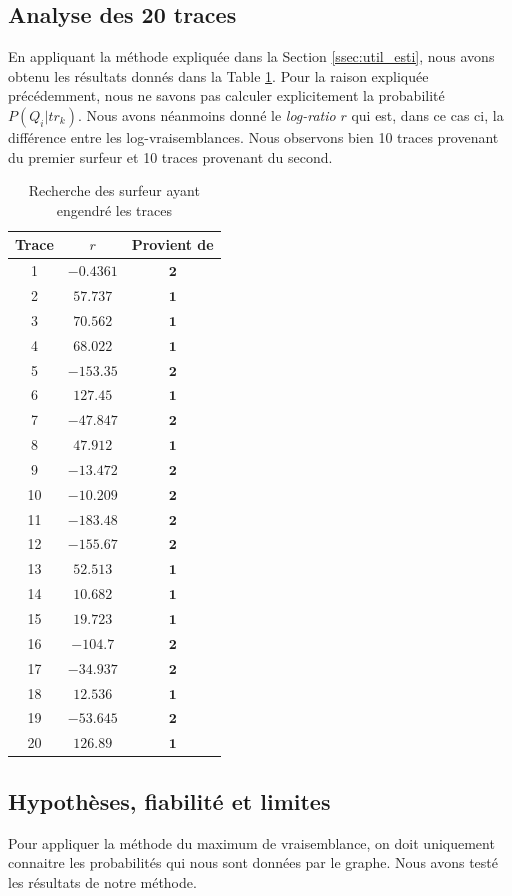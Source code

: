\documentclass[a4paper,titlepage]{report}
\begin{document}
\subsection{Analyse des 20 traces}
En appliquant la méthode expliquée dans la Section \ref{ssec:util_esti}, nous avons obtenu les résultats donnés dans la Table \ref{tab:surf_trace}. Pour la raison expliquée précédemment, nous ne savons pas calculer explicitement la probabilité $ P(Q_i|tr_k)$. Nous avons néanmoins donné le \textit{log-ratio} $r$ qui est, dans ce cas ci, la différence entre les log-vraisemblances.
Nous observons bien 10 traces provenant du premier surfeur et 10 traces provenant du second.
\begin{table}[ht]
	\center
	\begin{tabular}{|c|cc|}
		\hline
		Trace & $r$ & Provient de \\
		\hline
		1 & $ -0.4361$ & $\mathbf{2}$ \\
		2 & $57.737$ & $\mathbf{1}$ \\
		3 & $70.562$ & $\mathbf{1}$ \\
		4 & $68.022$ & $\mathbf{1}$ \\
		5 & $-153.35$ & $\mathbf{2}$ \\
		6 & $127.45$ & $\mathbf{1}$ \\
		7 & $-47.847$ & $\mathbf{2}$ \\
		8 & $47.912$ & $\mathbf{1}$ \\
		9 & $-13.472$ & $\mathbf{2}$ \\
		10 & $-10.209$ & $\mathbf{2}$ \\
		11 & $-183.48$ & $\mathbf{2}$ \\
		12 & $-155.67$ & $\mathbf{2}$ \\
		13 & $52.513$ & $\mathbf{1}$ \\
		14 & $10.682$ & $\mathbf{1}$ \\
		15 & $19.723$ & $\mathbf{1}$ \\
		16 & $-104.7$ & $\mathbf{2}$ \\
		17 & $-34.937$ & $\mathbf{2}$ \\
		18 & $12.536$ & $\mathbf{1}$ \\
		19 & $-53.645$ & $\mathbf{2}$ \\
		20 & $126.89$ & $\mathbf{1}$ \\
		\hline
	\end{tabular}
	\caption{Recherche des surfeur ayant engendré les traces}
	\label{tab:surf_trace}
\end{table}
\subsection{Hypothèses, fiabilité et limites}
Pour appliquer la méthode du maximum de vraisemblance, on doit uniquement connaitre les probabilités qui nous sont données par le graphe. Nous avons testé les résultats de notre méthode. 
\end{document}
